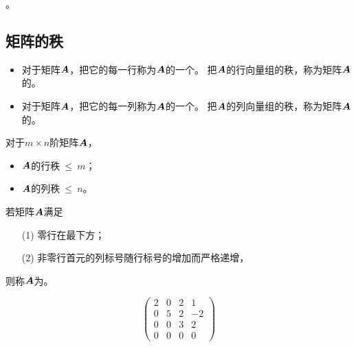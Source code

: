\begin{frame}
  \begin{tuilun}
    。
  \end{tuilun}
\end{frame}

\subsection{矩阵的秩}
\begin{frame}
  \begin{dingyi}[行秩 \& 列秩]
    \begin{itemize}
    \item
      对于矩阵$\boldsymbol{A}$，把它的每一行称为$\boldsymbol{A}$的一个。
      把$\boldsymbol{A}$的行向量组的秩，称为矩阵$\boldsymbol{A}$的。
    \item
      对于矩阵$\boldsymbol{A}$，把它的每一列称为$\boldsymbol{A}$的一个。
      把$\boldsymbol{A}$的列向量组的秩，称为矩阵$\boldsymbol{A}$的。
    \end{itemize}      
  \end{dingyi}    
  对于$m\times n$阶矩阵$\boldsymbol{A}$，
  \begin{itemize}
  \item $\boldsymbol{A}$的行秩$~\le~ m$；
  \item $\boldsymbol{A}$的列秩$~\le~ n$。
  \end{itemize}
\end{frame}

\begin{frame}
  \begin{dingyi}[阶梯形矩阵]
    若矩阵$\boldsymbol{A}$满足
    \begin{itemize}
    \item[(1)] 零行在最下方；
    \item[(2)] 非零行首元的列标号随行标号的增加而严格递增，
    \end{itemize}
    则称$\boldsymbol{A}$为。
  \end{dingyi}

  \begin{li*}
    $$
    \left(
      \begin{array}{rrrr}
        2&0&2&1\\
        0&5&2&-2\\
        0&0&3&2\\
        0&0&0&0
      \end{array}
    \right)
    $$
  \end{li*}
\end{frame}


